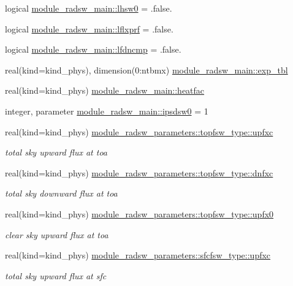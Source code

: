 \begin{DoxyCompactItemize}
\item 
logical \hyperlink{group__module__radsw__main_ga3fd8cae0d38772eea36ce6ec2d258997}{module\+\_\+radsw\+\_\+main\+::lhsw0} = .false.
\item 
logical \hyperlink{group__module__radsw__main_gac4ab674edb40fda0c89aa8ee331ccdc6}{module\+\_\+radsw\+\_\+main\+::lflxprf} = .false.
\item 
logical \hyperlink{group__module__radsw__main_ga8c0a241d6c1aa69fee4cd24fdbc4256b}{module\+\_\+radsw\+\_\+main\+::lfdncmp} = .false.
\item 
real(kind=kind\+\_\+phys), dimension(0\+:ntbmx) \hyperlink{group__module__radsw__main_ga1f9d18b17cc24321ed1cf45254ac2b0f}{module\+\_\+radsw\+\_\+main\+::exp\+\_\+tbl}
\item 
real(kind=kind\+\_\+phys) \hyperlink{group__module__radsw__main_gaad60e753cdda20d4e84d063280f0dfcc}{module\+\_\+radsw\+\_\+main\+::heatfac}
\item 
integer, parameter \hyperlink{group__module__radsw__main_gae1f88a0b60d69b892cfae83bb9ab67df}{module\+\_\+radsw\+\_\+main\+::ipsdsw0} = 1
\item 
real(kind=kind\+\_\+phys) \hyperlink{group__module__radsw__main_ga444a7fd67ff2c22403779a5e83eef09b}{module\+\_\+radsw\+\_\+parameters\+::topfsw\+\_\+type\+::upfxc}
\begin{DoxyCompactList}\small\item\em total sky upward flux at toa \end{DoxyCompactList}\item 
real(kind=kind\+\_\+phys) \hyperlink{group__module__radsw__main_gac1466bb6a9da92a59bdef51439320f35}{module\+\_\+radsw\+\_\+parameters\+::topfsw\+\_\+type\+::dnfxc}
\begin{DoxyCompactList}\small\item\em total sky downward flux at toa \end{DoxyCompactList}\item 
real(kind=kind\+\_\+phys) \hyperlink{group__module__radsw__main_ga992c82c935dcb4d6269c905fc184cf48}{module\+\_\+radsw\+\_\+parameters\+::topfsw\+\_\+type\+::upfx0}
\begin{DoxyCompactList}\small\item\em clear sky upward flux at toa \end{DoxyCompactList}\item 
real(kind=kind\+\_\+phys) \hyperlink{group__module__radsw__main_ga89e2285e3148921e989cb27cda4294a1}{module\+\_\+radsw\+\_\+parameters\+::sfcfsw\+\_\+type\+::upfxc}
\begin{DoxyCompactList}\small\item\em total sky upward flux at sfc \end{DoxyCompactList}\item 

\end{DoxyCompactItemize}
